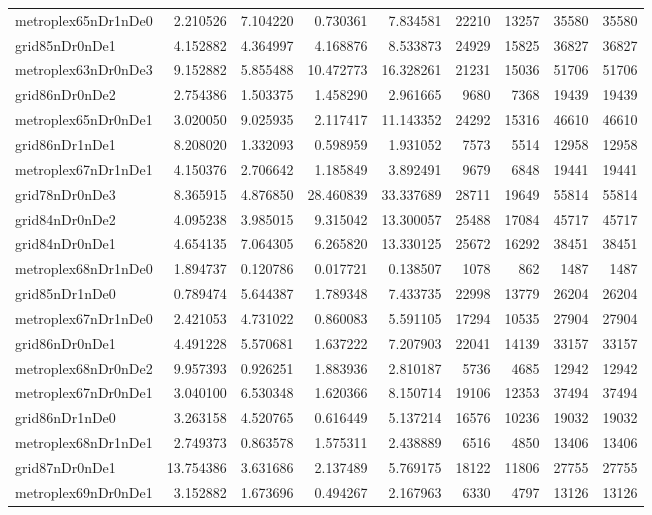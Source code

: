 \begin{longtable}{|l|r|r|r|r|r|r|r|r|}
metroplex65nDr1nDe0 & 2.210526 & 7.104220 & 0.730361 & 7.834581 & 22210 & 13257 & 35580 & 35580 \\
grid85nDr0nDe1 & 4.152882 & 4.364997 & 4.168876 & 8.533873 & 24929 & 15825 & 36827 & 36827 \\
metroplex63nDr0nDe3 & 9.152882 & 5.855488 & 10.472773 & 16.328261 & 21231 & 15036 & 51706 & 51706 \\
grid86nDr0nDe2 & 2.754386 & 1.503375 & 1.458290 & 2.961665 & 9680 & 7368 & 19439 & 19439 \\
metroplex65nDr0nDe1 & 3.020050 & 9.025935 & 2.117417 & 11.143352 & 24292 & 15316 & 46610 & 46610 \\
grid86nDr1nDe1 & 8.208020 & 1.332093 & 0.598959 & 1.931052 & 7573 & 5514 & 12958 & 12958 \\
metroplex67nDr1nDe1 & 4.150376 & 2.706642 & 1.185849 & 3.892491 & 9679 & 6848 & 19441 & 19441 \\
grid78nDr0nDe3 & 8.365915 & 4.876850 & 28.460839 & 33.337689 & 28711 & 19649 & 55814 & 55814 \\
grid84nDr0nDe2 & 4.095238 & 3.985015 & 9.315042 & 13.300057 & 25488 & 17084 & 45717 & 45717 \\
grid84nDr0nDe1 & 4.654135 & 7.064305 & 6.265820 & 13.330125 & 25672 & 16292 & 38451 & 38451 \\
metroplex68nDr1nDe0 & 1.894737 & 0.120786 & 0.017721 & 0.138507 & 1078 & 862 & 1487 & 1487 \\
grid85nDr1nDe0 & 0.789474 & 5.644387 & 1.789348 & 7.433735 & 22998 & 13779 & 26204 & 26204 \\
metroplex67nDr1nDe0 & 2.421053 & 4.731022 & 0.860083 & 5.591105 & 17294 & 10535 & 27904 & 27904 \\
grid86nDr0nDe1 & 4.491228 & 5.570681 & 1.637222 & 7.207903 & 22041 & 14139 & 33157 & 33157 \\
metroplex68nDr0nDe2 & 9.957393 & 0.926251 & 1.883936 & 2.810187 & 5736 & 4685 & 12942 & 12942 \\
metroplex67nDr0nDe1 & 3.040100 & 6.530348 & 1.620366 & 8.150714 & 19106 & 12353 & 37494 & 37494 \\
grid86nDr1nDe0 & 3.263158 & 4.520765 & 0.616449 & 5.137214 & 16576 & 10236 & 19032 & 19032 \\
metroplex68nDr1nDe1 & 2.749373 & 0.863578 & 1.575311 & 2.438889 & 6516 & 4850 & 13406 & 13406 \\
grid87nDr0nDe1 & 13.754386 & 3.631686 & 2.137489 & 5.769175 & 18122 & 11806 & 27755 & 27755 \\
metroplex69nDr0nDe1 & 3.152882 & 1.673696 & 0.494267 & 2.167963 & 6330 & 4797 & 13126 & 13126 \\

\end{longtable}
